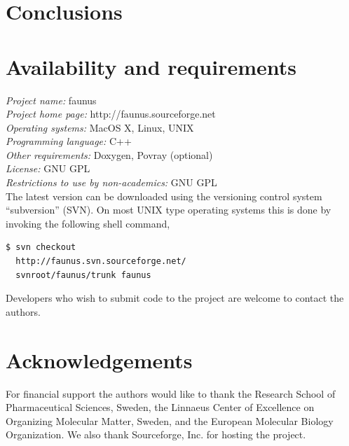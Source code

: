\documentclass[10pt]{bmc_article}
\newenvironment{bmcformat}{\fussy\setboolean{publ}{true}}{\fussy}
\begin{document}
\begin{bmcformat}
    

\section*{Conclusions}

\section*{Availability and requirements}
\textsl{Project name:} faunus\\
\textsl{Project home page:} http://faunus.sourceforge.net\\
\textsl{Operating systems:} MacOS X, Linux, UNIX\\
\textsl{Programming language:} C++\\
\textsl{Other requirements:} Doxygen, Povray (optional)\\
\textsl{License:} GNU GPL\\
\textsl{Restrictions to use by non-academics:} GNU GPL\\

The latest version can be downloaded using the versioning control system ``subversion'' (SVN).
On most UNIX type operating systems this is done by invoking the following shell command,
\begin{verbatim}
$ svn checkout
  http://faunus.svn.sourceforge.net/
  svnroot/faunus/trunk faunus
\end{verbatim}
Developers who wish to submit code to the project are welcome to contact the authors.



    

\section*{Acknowledgements}
  For financial support the authors would like to thank the Research School of Pharmaceutical Sciences, Sweden, the Linnaeus Center of Excellence on Organizing Molecular Matter, Sweden,
and the European Molecular Biology Organization. We also thank Sourceforge, Inc. for hosting the project.


\end{bmcformat}
\end{document}
